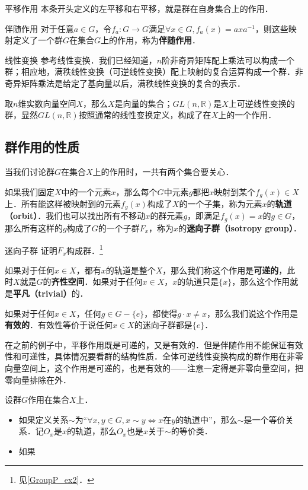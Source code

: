 \begin{example}{平移作用}\label{Group3_ex1}
本条开头定义的左平移和右平移，就是群在自身集合上的作用．
\end{example}

\begin{example}{伴随作用}\label{Group3_ex2}
对于任意$a\in G$，令$f_a: G\rightarrow G$满足$\forall x\in G, f_a(x)=axa^{-1}$，则这些映射定义了一个群$G$在集合$G$上的作用，称为\textbf{伴随作用}．
\end{example}

\begin{example}{线性变换}\label{Group3_ex3}
参考线性变换．我们已经知道，$n$阶非奇异矩阵配上乘法可以构成一个群；相应地，满秩线性变换（可逆线性变换）配上映射的复合运算构成一个群．非奇异矩阵乘法是给定了基向量以后，满秩线性变换的复合的表示．

取$n$维实数向量空间$X$，那么$X$是向量的集合；$GL(n,\mathbb{R})$是$X$上可逆线性变换的群，显然$GL(n,\mathbb{R})$按照通常的线性变换定义，构成了在$X$上的一个作用．
\end{example}

\subsection{群作用的性质}

当我们讨论群$G$在集合$X$上的作用时，一共有两个集合要关心．

如果我们固定$X$中的一个元素$x$，那么每个$G$中元素$g$都把$x$映射到某个$f_g(x)\in X$上．所有能这样被映射到的元素$f_g(x)$构成了$X$的一个子集，称为元素$x$的\textbf{轨道（orbit）}．我们也可以找出所有不移动$x$的群元素$g$，即满足$f_g(x)=x$的$g\in G$，那么所有这样的$g$构成了$G$的一个子群$F_x$，称为$x$的\textbf{迷向子群（isotropy group）}．

\begin{exercise}{迷向子群}\label{Group3_exe1}
证明$F_x$构成群．\footnote{见\autoref{GroupP_ex2}．}
\end{exercise}

如果对于任何$x\in X$，都有$x$的轨道是整个$X$，那么我们称这个作用是\textbf{可递的}，此时$X$就是$G$的\textbf{齐性空间}．如果对于任何$x\in X$，$x$的轨道只是$\{x\}$，那么这个作用就是\textbf{平凡（trivial）}的．

如果对于任何$x\in X$，任何$g\in G-\{e\}$，都使得$g\cdot x\not=x$，那么我们说这个作用是\textbf{有效的}．有效性等价于说任何$x\in X$的迷向子群都是$\{e\}$．

在之前的例子中，平移作用既是可递的，又是有效的．但是伴随作用不能保证有效性和可递性，具体情况要看群的结构性质．全体可逆线性变换构成的群作用在非零向量空间上，这个作用是可递的，也是有效的——注意一定得是非零向量空间，把零向量排除在外．

\begin{theorem}{}\label{Group3_the1}
设群$G$作用在集合$X$上．

\begin{itemize}

\item 如果定义关系$\sim$为“$\forall x, y\in G, x\sim y\iff x$在$y$的轨道中”，那么$\sim$是一个等价关系．记$O_x$是$x$的轨道，那么$O_x$也是$x$关于$\sim$的等价类．
\item 如果

\end{itemize}
\end{theorem}
